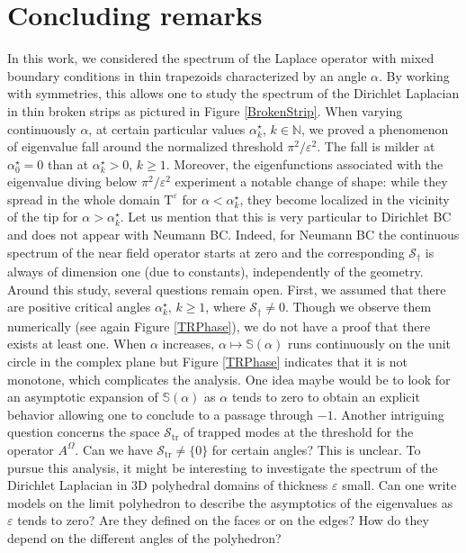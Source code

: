 \documentclass[11pt,a4paper]{article}
\newcommand{\eps}{\varepsilon}
\newcommand{\Om}{\Omega}
\newcommand{\mrm}[1]{\mathrm{#1}}
\newcommand{\N}{\mathbb{N}}
\newcommand{\mX}{\mathscr{S}}
\begin{document}
\section{Concluding remarks}


\noindent In this work, we considered the spectrum of the  Laplace operator with mixed boundary conditions in thin trapezoids characterized by an angle $\alpha$. By working with symmetries, this allows one to study the spectrum of the Dirichlet Laplacian in thin broken strips as pictured in Figure \ref{BrokenStrip}. When varying  continuously $\alpha$, at certain particular values $\alpha^\star_k$, $k\in\N$, we proved a phenomenon of eigenvalue fall around the normalized threshold $\pi^2/\eps^2$. The fall is milder at $\alpha^\star_0=0$ than at $\alpha^\star_k>0$, $k\ge1$. Moreover, the eigenfunctions associated with the eigenvalue diving below $\pi^2/\eps^2$ experiment a notable change of shape: while they spread in the whole domain $\mathrm{T}^\eps$ for $\alpha<\alpha^\star_k$, they become localized in the vicinity of the tip for $\alpha>\alpha^\star_k$. Let us mention that this is very particular to Dirichlet BC and does not appear with Neumann BC. Indeed, for Neumann BC the continuous spectrum of the near field operator starts at zero and the corresponding $\mX_{\dagger}$ is always of dimension one (due to constants), independently of the geometry.\\
\newline
Around this study, several questions remain open. First, we assumed that there are positive critical angles $\alpha^\star_k$, $k\ge1$, where $\mX_{\dagger}\ne0$. Though we observe them numerically (see again Figure \ref{TRPhase}), we do not have a proof that there exists at least one. When $\alpha$ increases, $\alpha\mapsto \mathbb{S}(\alpha)$ runs continuously on the unit circle in the complex plane but Figure \ref{TRPhase} indicates that it is not monotone, which complicates the analysis. One idea maybe would be to look for an asymptotic expansion of $\mathbb{S}(\alpha)$ as $\alpha$ tends to zero to obtain an explicit behavior allowing one to conclude to a passage through $-1$. Another intriguing question concerns the space $\mX_{\mrm{tr}}$ of trapped modes at the threshold for the operator $A^\Om$. Can we have $\mX_{\mrm{tr}}\ne\{0\}$ for certain angles? This is unclear. To pursue this analysis, it might be interesting to investigate the spectrum of the Dirichlet Laplacian in 3D polyhedral domains of thickness $\eps$ small. Can one write models on the limit polyhedron to describe the asymptotics of the eigenvalues as $\eps$ tends to zero? Are they defined on the faces or on the edges? How do they depend on the different angles of the polyhedron?
\end{document}
